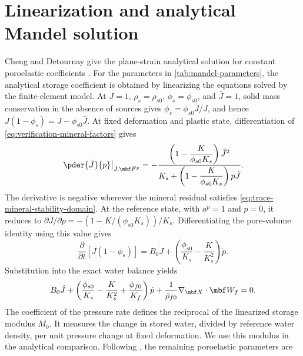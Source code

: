\section{Linearization and analytical Mandel solution}
\label{sec:mandel-analytical-solution}

Cheng and Detournay give the plane-strain analytical solution for constant
poroelastic coefficients \citep{chengdetournay1988}.  For the parameters in
\cref{tab:mandel-parameters}, the analytical storage coefficient is obtained by
linearizing the equations solved by the finite-element model.  At
\(J=1\), \(\rho_s=\rho_{s0}\), \(\phi_s=\phi_{s0}\), and \(\bar J=1\), solid mass conservation in the absence of sources gives \(\phi_s=\phi_{s0}\bar J/J\), and hence
\(J(1-\phi_s)=J-\phi_{s0}\bar J\).  At fixed deformation and plastic
state, differentiation of \eqref{eq:verification-mineral-factors} gives
\begin{equation*}
 \left.\pder{\bar J}{p}\right|_{J,\mbf F^p}
 =-\frac{\left(1-\dfrac{K}{\phi_{s0}K_s}\right)\bar J^2}
 {K_s+\left(1-\dfrac{K}{\phi_{s0}K_s}\right)p\bar J}.
\end{equation*}
The derivative is negative wherever the mineral residual satisfies
\eqref{eq:trace-mineral-stability-domain}.  At the reference state, with
\(a^p=1\) and \(p=0\), it reduces to
\(\partial\bar J/\partial p=-(1-K/(\phi_{s0}K_s))/K_s\).
Differentiating the pore-volume identity using this value gives
\begin{equation*}
 \frac{\partial}{\partial t}\left[J(1-\phi_s)\right]
 =B_0\dot J+\left(\frac{\phi_{s0}}{K_s}-\frac{K}{K_s^2}\right)\dot p.
\end{equation*}
Substitution into the exact water balance yields
\begin{equation*}
 B_0\dot J
 +\left(
  \frac{\phi_{s0}}{K_s}-\frac{K}{K_s^2}+\frac{\phi_{f0}}{K_f}
 \right)\dot p
 +\frac{1}{\bar\rho_{f0}}
 \nabla_{\mbf X}\mathbin{\cdot}\mbf W_f=0.
\end{equation*}
The coefficient of the pressure rate defines the reciprocal of the
linearized storage modulus \(M_0\).  It measures the change in
stored water, divided by reference water density, per unit pressure change
at fixed deformation.  We use this modulus in the analytical comparison.
Following \citet{chengdetournay1988}, the remaining poroelastic parameters are

